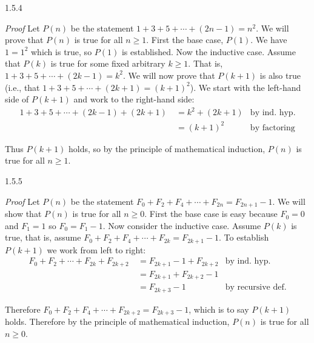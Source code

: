 \documentclass[11pt,]{book}
\makeatletter
\theoremstyle{ptxplainnotitle}
\theoremstyle{ptxplaintitle}
\renewcommand*{\proofname}{Proof}
\renewenvironment{proof}[1][\proofname]{\par
  \pushQED{\qed}%
  \normalfont \topsep6\p@\@plus6\p@\relax
  \trivlist
  \item\relax
    {\itshape
    #1\@addpunct{.}}\hspace\labelsep\ignorespaces
}{%
  \popQED\endtrivlist\@endpefalse
}
\theoremstyle{ptxdefinitionnotitle}
\theoremstyle{ptxdefinitiontitle}
\theoremstyle{ptxdefinitionnotitle}
\theoremstyle{ptxdefinitiontitle}
\theoremstyle{ptxdefinitionnotitle}
\theoremstyle{ptxdefinitiontitle}
\theoremstyle{ptxdefinitiontitlenonumber}
\theoremstyle{ptxdefinitiontitlenonumber}
\numberwithin{equation}{chapter}
\newcommand{\amp}{&}
\makeatother
\begin{document}
\begin{divisionexercise}{1.5.4}
\textbf{}\begin{proof}\hypertarget{proof-7}{}
\hypertarget{p-602}{}%
Let \(P(n)\) be the statement \(1+3 +5 + \cdots + (2n-1) = n^2\). We will prove that \(P(n)\) is true for all \(n \ge 1\). First the base case, \(P(1)\). We have \(1 = 1^2\) which is true, so \(P(1)\) is established. Now the inductive case. Assume that \(P(k)\) is true for some fixed arbitrary \(k \ge 1\). That is, \(1 + 3 + 5 + \cdots + (2k-1) = k^2\). We will now prove that \(P(k+1)\) is also true (i.e., that \(1 + 3 + 5 + \cdots + (2k+1) = (k+1)^2\)). We start with the left-hand side of \(P(k+1)\) and work to the right-hand side:%
\begin{align*}
1 + 3 + 5 + \cdots + (2k-1) + (2k+1) ~ \amp = k^2 + (2k+1) \amp \text{by ind. hyp.}\\
\amp = (k+1)^2 \amp \text{by factoring}
\end{align*}
%
\par
\hypertarget{p-603}{}%
Thus \(P(k+1)\) holds, so by the principle of mathematical induction, \(P(n)\) is true for all \(n \ge 1\).%
\end{proof}
\end{divisionexercise}%
\begin{divisionexercise}{1.5.5}
\textbf{}\begin{proof}\hypertarget{proof-8}{}
\hypertarget{p-605}{}%
Let \(P(n)\) be the statement \(F_0 + F_2 + F_4 + \cdots + F_{2n} = F_{2n+1} - 1\). We will show that \(P(n)\) is true for all \(n \ge 0\). First the base case is easy because \(F_0 = 0\) and \(F_1 = 1\) so \(F_0 = F_1 - 1\). Now consider the inductive case. Assume \(P(k)\) is true, that is, assume \(F_0 + F_2 + F_4 + \cdots + F_{2k} = F_{2k+1} - 1\). To establish \(P(k+1)\) we work from left to right:%
\begin{align*}
F_0 + F_2 + \cdots + F_{2k} + F_{2k+2} ~ \amp = F_{2k+1} - 1 + F_{2k+2} \amp \text{by ind. hyp.}\\
\amp = F_{2k+1} + F_{2k+2} - 1 \amp\\
\amp = F_{2k+3} - 1 \amp \text{by recursive def.}
\end{align*}
%
\par
\hypertarget{p-606}{}%
Therefore \(F_0 + F_2 + F_4 + \cdots + F_{2k+2} = F_{2k+3} - 1\), which is to say \(P(k+1)\) holds. Therefore by the principle of mathematical induction, \(P(n)\) is true for all \(n \ge 0\).%
\end{proof}
\end{divisionexercise}%
\end{document}
